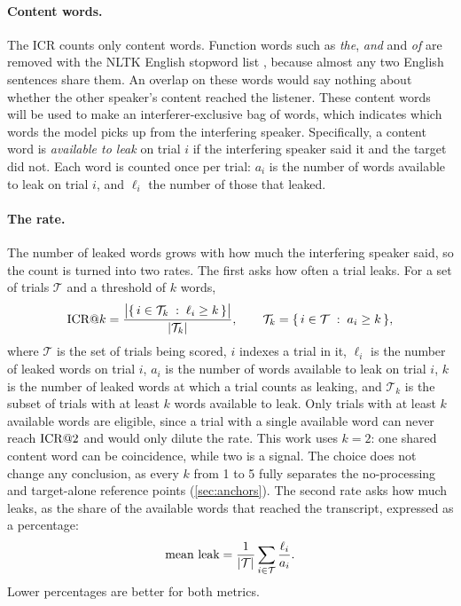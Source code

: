 \paragraph{Content words.} The ICR counts only content words. Function words such as \emph{the}, \emph{and} and \emph{of} are removed with the NLTK English stopword list \cite{bird2009nltk}, because almost any two English sentences share them. An overlap on these words would say nothing about whether the other speaker's content reached the listener. These content words will be used to make an interferer-exclusive bag of words, which indicates which words the model picks up from the interfering speaker. Specifically, a content word is \emph{available to leak} on trial $i$ if the interfering speaker said it and the target did not. Each word is counted once per trial: $a_i$ is the number of words available to leak on trial $i$, and $\ell_i$ the number of those that leaked.

\paragraph{The rate.} The number of leaked words grows with how much the interfering speaker said, so the count is turned into two rates. The first asks how often a trial leaks. For a set of trials $\mathcal{T}$ and a threshold of $k$ words,
\begin{equation}
\textup{ICR}@k = \frac{\big|\{\, i \in \mathcal{T}_k \;:\; \ell_i \ge k \,\}\big|}{|\mathcal{T}_k|},
\qquad\mathcal{T}_k = \{\, i \in \mathcal{T} \;:\; a_i \ge k \,\},
\label{eq:icrk}
\end{equation}
where $\mathcal{T}$ is the set of trials being scored, $i$ indexes a trial in it, $\ell_i$ is the number of leaked words on trial $i$, $a_i$ is the number of words available to leak on trial $i$, $k$ is the number of leaked words at which a trial counts as leaking, and $\mathcal{T}_k$ is the subset of trials with at least $k$ words available to leak.
Only trials with at least $k$ available words are eligible, since a trial with a single available word can never reach $\textup{ICR}@2$ and would only dilute the rate. This work uses $k = 2$: one shared content word can be coincidence, while two is a signal. The choice does not change any conclusion, as every $k$ from 1 to 5 fully separates the no-processing and target-alone reference points (\autoref{sec:anchors}). The second rate asks how much leaks, as the share of the available words that reached the transcript, expressed as a percentage:
\begin{equation}
\textup{mean leak} = \frac{1}{|\mathcal{T}|} \sum_{i \in \mathcal{T}} \frac{\ell_i}{a_i}.
\label{eq:meanleak}
\end{equation}                                                                                                                              
Lower percentages are better for both metrics.                               
                                                                                                                                            
